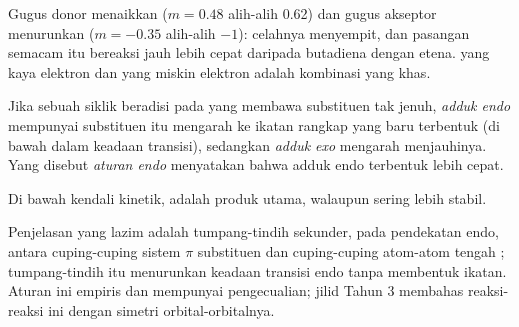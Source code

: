 Gugus donor menaikkan   ($m = 0.48$ alih-alih 0.62) dan gugus
akseptor menurunkan   ($m = -0.35$ alih-alih $-1$): celahnya
menyempit, dan pasangan semacam itu bereaksi jauh lebih cepat daripada
butadiena dengan etena.  yang kaya elektron dan  yang miskin
elektron adalah kombinasi yang khas.

\begin{definition}\label{def:b2:frontier-orbitals:endo}
Jika sebuah  siklik beradisi pada  yang membawa substituen
tak jenuh, \emph{adduk endo} mempunyai substituen itu
mengarah ke ikatan rangkap yang baru terbentuk (di bawah  dalam
keadaan transisi), sedangkan \emph{adduk exo} mengarah
menjauhinya. Yang disebut \emph{aturan endo} menyatakan
bahwa adduk endo terbentuk lebih cepat.
\end{definition}

\begin{proposition}\label{prop:b2:frontier-orbitals:endo}
Di bawah kendali kinetik,  adalah produk utama, walaupun  sering lebih stabil.
\end{proposition}

\admitted

Penjelasan yang lazim adalah tumpang-tindih sekunder, pada pendekatan
endo, antara cuping-cuping sistem $\pi$ substituen dan cuping-cuping
atom-atom tengah  ; tumpang-tindih itu menurunkan keadaan transisi
endo tanpa membentuk ikatan. Aturan ini empiris dan mempunyai
pengecualian; jilid Tahun 3 membahas reaksi-reaksi ini dengan simetri
orbital-orbitalnya.

